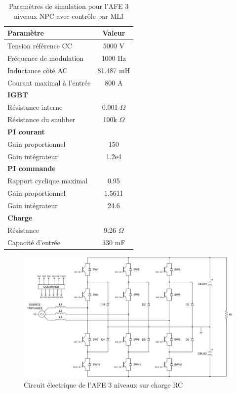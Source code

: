 \begin{table}[htb]
\centering
\begin{tabular}{|l|c|} 
  \hline
  \textbf{Paramètre} & \textbf{Valeur}  \\
  \hline\hline
  Tension référence CC & 5000 V\\ \hline
  Fréquence de modulation & 1000 Hz \\ \hline
  Inductance côté AC& 81.487 mH\\ \hline
  Courant maximal à l'entrée& 800 A \\ \hline \hline
  \multicolumn{2}{|l|}{\textbf{IGBT}}\\ \hline
  Résistance interne & 0.001 $\Omega$\\
  Résistance du snubber & 100k $\Omega$\\ \hline \hline
   \multicolumn{2}{|l|}{\textbf{PI courant}}\\ \hline
  Gain proportionnel & 150 \\
  Gain intégrateur & 1.2e4 \\ \hline \hline
  \multicolumn{2}{|l|}{\textbf{PI commande}}\\ \hline
  Rapport cyclique maximal & 0.95\\
  Gain proportionnel & 1.5611 \\
  Gain intégrateur & 24.6 \\ \hline \hline
  \multicolumn{2}{|l|}{\textbf{Charge}}\\ \hline
  Résistance & 9.26 $\Omega$ \\
  Capacité d'entrée & 330 mF\\
  \hline
\end{tabular}
\caption{Paramètres de simulation pour l'AFE 3 niveaux NPC avec contrôle par MLI}
\label{p_AF_3level}
\end{table}

\begin{figure}[htb]
\centering
\includegraphics[scale=0.6]{fig/AFE_3L_RC.png}
\caption{Circuit électrique de l'AFE 3 niveaux sur charge RC}
\label{circuit_AFE_3L_RC}
\end{figure}


